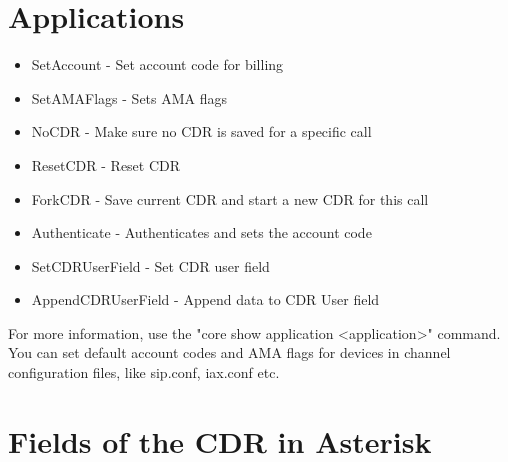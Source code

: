 \section{Applications}

\begin{itemize}
    \item SetAccount - Set account code for billing
    \item SetAMAFlags - Sets AMA flags
    \item NoCDR - Make sure no CDR is saved for a specific call
    \item ResetCDR - Reset CDR
    \item ForkCDR - Save current CDR and start a new CDR for this call
    \item Authenticate - Authenticates and sets the account code
    \item SetCDRUserField - Set CDR user field
    \item AppendCDRUserField - Append data to CDR User field 
\end{itemize}

For more information, use the "core show application <application>" command.
You can set default account codes and AMA flags for devices in 
channel configuration files, like sip.conf, iax.conf etc.

\section{Fields of the CDR in Asterisk}

